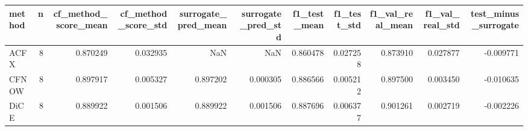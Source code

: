 \begin{tabular}{lrrrrrrrrrr}
\toprule
method &  n &  cf\_method\_score\_mean &  cf\_method\_score\_std &  surrogate\_pred\_mean &  surrogate\_pred\_std &  f1\_test\_mean &  f1\_test\_std &  f1\_val\_real\_mean &  f1\_val\_real\_std &  test\_minus\_surrogate \\
\midrule
  ACFX &  8 &              0.870249 &             0.032935 &                  NaN &                 NaN &      0.860478 &     0.027258 &          0.873910 &         0.027877 &             -0.009771 \\
 CFNOW &  8 &              0.897917 &             0.005327 &             0.897202 &            0.000305 &      0.886566 &     0.005212 &          0.897500 &         0.003450 &             -0.010635 \\
  DiCE &  8 &              0.889922 &             0.001506 &             0.889922 &            0.001506 &      0.887696 &     0.006377 &          0.901261 &         0.002719 &             -0.002226 \\
\bottomrule
\end{tabular}
